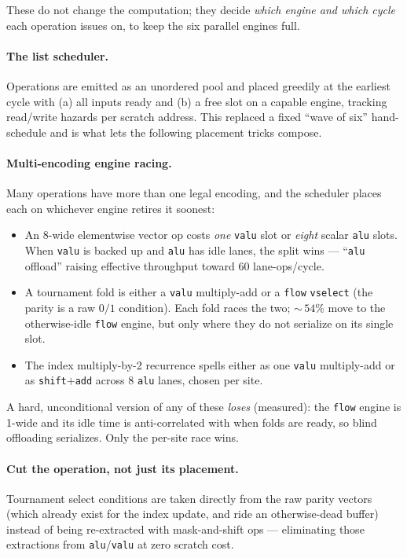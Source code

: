 \documentclass[11pt]{article}
\newcommand{\code}[1]{\texttt{#1}}
\begin{document}
These do not change the computation; they decide \emph{which engine and which
cycle} each operation issues on, to keep the six parallel engines full.

\paragraph{The list scheduler.} Operations are emitted as an unordered pool
and placed greedily at the earliest cycle with (a) all inputs ready and (b) a
free slot on a capable engine, tracking read/write hazards per scratch
address. This replaced a fixed ``wave of six'' hand-schedule and is what lets
the following placement tricks compose.

\paragraph{Multi-encoding engine racing.} Many operations have more than one
legal encoding, and the scheduler places each on whichever engine retires it
soonest:
\begin{itemize}\itemsep2pt
  \item An 8-wide elementwise vector op costs \emph{one} \code{valu} slot or
    \emph{eight} scalar \code{alu} slots. When \code{valu} is backed up and
    \code{alu} has idle lanes, the split wins --- ``\code{alu} offload''
    raising effective throughput toward $60$ lane-ops/cycle.
  \item A tournament fold is either a \code{valu} multiply-add or a
    \code{flow} \code{vselect} (the parity is a raw $0/1$ condition). Each
    fold races the two; ${\sim}\,54\%$ move to the otherwise-idle \code{flow}
    engine, but only where they do not serialize on its single slot.
  \item The index multiply-by-2 recurrence spells either as one \code{valu}
    multiply-add or as \code{shift}${+}$\code{add} across 8 \code{alu} lanes,
    chosen per site.
\end{itemize}
A hard, unconditional version of any of these \emph{loses} (measured): the
\code{flow} engine is 1-wide and its idle time is anti-correlated with when
folds are ready, so blind offloading serializes. Only the per-site race wins.

\paragraph{Cut the operation, not just its placement.} Tournament select
conditions are taken directly from the raw parity vectors (which already
exist for the index update, and ride an otherwise-dead buffer) instead of
being re-extracted with mask-and-shift ops --- eliminating those extractions
from \code{alu}/\code{valu} at zero scratch cost.
\end{document}

